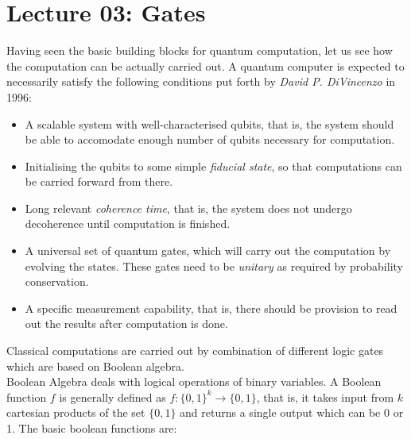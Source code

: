 \section*{Lecture 03: Gates}
Having seen the basic building blocks for quantum computation, let us see how the computation can be actually carried out. A quantum computer is expected to necessarily satisfy the following conditions put forth by \textit{David P. DiVincenzo} in 1996:
\begin{itemize}
    \item A scalable system with well-characterised qubits, that is, the system should be able to accomodate enough number of qubits necessary for computation. 
    \item Initialising the qubits to some simple \textit{fiducial state}, so that computations can be carried forward from there.
    \item Long relevant \textit{coherence time}, that is, the system does not undergo decoherence until computation is finished. 
    \item A universal set of quantum gates, which will carry out the computation by evolving the states. These gates need to be \textit{unitary} as required by probability conservation.
    \item A specific measurement capability, that is, there should be provision to read out the results after computation is done. 
\end{itemize}
Classical computations are carried out by combination of different logic gates which are based on Boolean algebra. \\[0.2cm]
Boolean Algebra deals with logical operations of binary variables. A Boolean function $f$ is generally defined as $f: \{0,1\}^k \rightarrow \{0,1\} $, that is, it takes input from $k$ cartesian products of the set $\{0,1\}$ and returns a single output which can be 0 or 1. The basic boolean functions are: 
